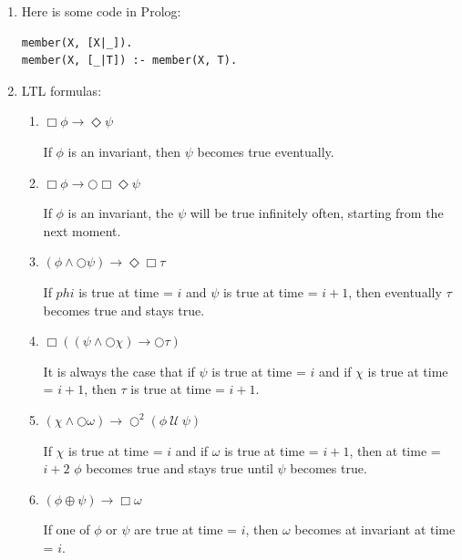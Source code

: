 \documentclass[12pt]{article}
\begin{document}
\begin{enumerate}

\item Here is some code in Prolog:

\begin{verbatim}
member(X, [X|_]).
member(X, [_|T]) :- member(X, T).
\end{verbatim}


\item LTL formulas:

\begin{enumerate}
	
	\item $\Box \phi \rightarrow \Diamond \psi $
	
	\noindent If $\phi$ is an invariant, then $\psi$ becomes true eventually.
	
	\item $\Box \phi \rightarrow \bigcirc \Box \Diamond \psi$
	
	\noindent If $\phi$ is an invariant, the $\psi$ will be true infinitely often, starting 	
	from the next moment.
	
	\item $(\phi \wedge \bigcirc \psi) \rightarrow \Diamond \Box \tau$	
	
	\noindent If $phi$ is true at time = $i$ and $\psi$ is true at time = $i + 1$,
	then eventually $\tau$ becomes true and stays true.
	
	\item $\Box (( \psi \wedge \bigcirc \chi) \rightarrow \bigcirc \tau)$
	
	\noindent It is always the case that if $\psi$ is true at time = $i$ and if $\chi$ is 	 
	true at time = $i + 1$, then $\tau$ is true at time = $i + 1.$
	
	\item $ (\chi \wedge \bigcirc \omega) \rightarrow \bigcirc^{2} ( \phi ~\mathcal{U}~ \psi )$
	
	\noindent If $\chi$ is true at time = $i$ and if $\omega$ is true at time = $i + 1$,
	then at time  = $i + 2$ $\phi$ becomes true and stays true until $\psi$ becomes 
	true.
	
	\item $( \phi \oplus \psi ) \rightarrow \Box \omega $
	
	\noindent If one of $\phi$ or $\psi$ are true at time = $i$, then $\omega$ becomes at
	invariant at time = $i.$	
	
	
\end{enumerate}



\end{enumerate}
\end{document}
